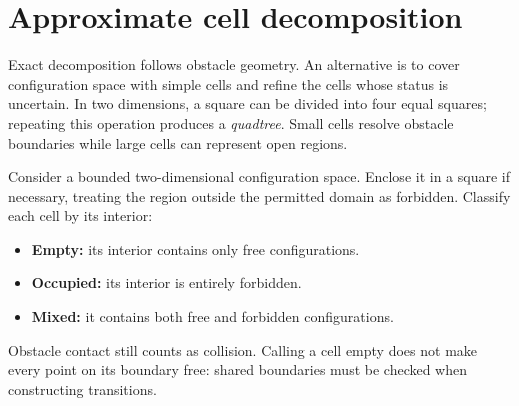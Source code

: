 \section{Approximate cell decomposition}
\label{sec:l13-approximate}
Exact decomposition follows obstacle geometry. An alternative is to cover
configuration space with simple cells and refine the cells whose status is
uncertain. In two dimensions, a square can be divided into four equal
squares; repeating this operation produces a \emph{quadtree}. Small cells
resolve obstacle boundaries while large cells can represent open regions.

Consider a bounded two-dimensional configuration space. Enclose it in a
square if necessary, treating the region outside the permitted domain as
forbidden. Classify each cell by its interior:
\begin{itemize}
\item \textbf{Empty:} its interior contains only free configurations.
\item \textbf{Occupied:} its interior is entirely forbidden.
\item \textbf{Mixed:} it contains both free and forbidden configurations.
\end{itemize}
Obstacle contact still counts as collision. Calling a cell empty does
not make every point on its boundary free: shared boundaries must be
checked when constructing transitions.

